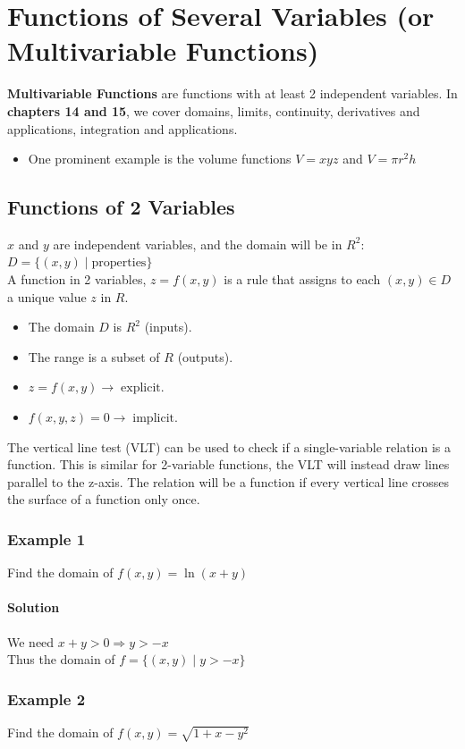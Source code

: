 \documentclass{article}
\begin{document}
\section{Functions of Several Variables (or Multivariable Functions)}
\textbf{Multivariable Functions} are functions with at least 2 independent variables.
In \textbf{chapters 14 and 15}, we cover domains, limits, continuity, derivatives
and applications, integration and applications. \begin{itemize}
    \item One prominent example is the volume functions $V=xyz$ and $V=\pi r^2h$
\end{itemize}

\subsection{Functions of 2 Variables}
$x$ and $y$ are independent variables, and the domain will be in $R^2$:
$D=\{(x,y)\;|\;\text{properties}\}$
\\A function in 2 variables, $z=f(x,y)$ is a rule that assigns to each $(x,y)\in D$ a unique value $z$ in $R$.
\begin{itemize}
    \itemsep 0em
    \item The domain $D$ is $R^2$ (inputs).
    \item The range is a subset of $R$ (outputs).
    \item $z=f(x,y)\rightarrow\;\text{explicit.}$
    \item $f(x,y,z)=0\rightarrow\;\text{implicit.}$
\end{itemize}

The vertical line test (VLT) can be used to check if a single-variable relation is a function.
This is similar for 2-variable functions, the VLT will instead draw lines parallel to the z-axis.
The relation will be a function if every vertical line crosses the surface of a function only once.

\subsubsection{Example 1}
Find the domain of $f(x,y)=\ln(x+y)$
\paragraph{Solution} We need $x+y>0\Rightarrow y>-x$
\\Thus the domain of $f=\{(x,y)\;|\;y>-x\}$

\subsubsection{Example 2}
Find the domain of $f(x,y)=\sqrt{1+x-y^2}$
\end{document}
